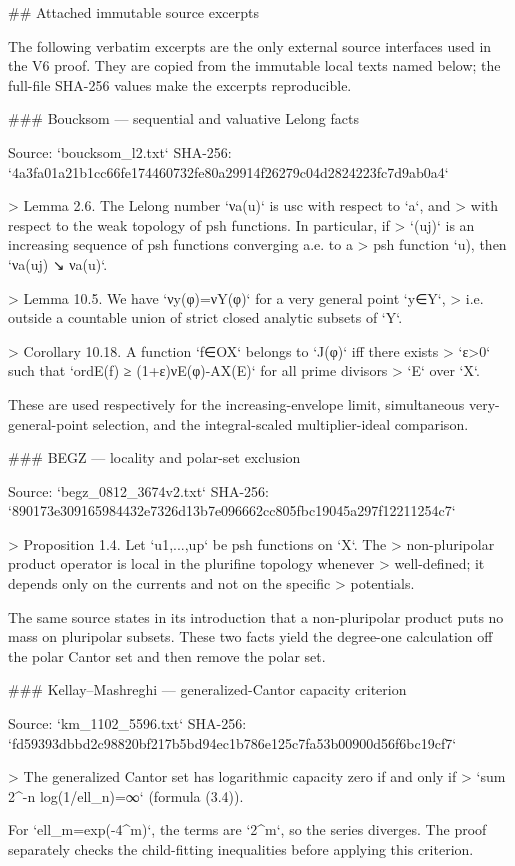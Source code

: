 ## Attached immutable source excerpts

The following verbatim excerpts are the only external source interfaces used
in the V6 proof.  They are copied from the immutable local texts named below;
the full-file SHA-256 values make the excerpts reproducible.

### Boucksom — sequential and valuative Lelong facts

Source: `boucksom_l2.txt`
SHA-256: `4a3fa01a21b1cc66fe174460732fe80a29914f26279c04d2824223fc7d9ab0a4`

> Lemma 2.6. The Lelong number `νa(u)` is usc with respect to `a`, and
> with respect to the weak topology of psh functions. In particular, if
> `(uj)` is an increasing sequence of psh functions converging a.e. to a
> psh function `u), then `νa(uj) ↘ νa(u)`.

> Lemma 10.5. We have `νy(φ)=νY(φ)` for a very general point `y∈Y`,
> i.e. outside a countable union of strict closed analytic subsets of `Y`.

> Corollary 10.18. A function `f∈OX` belongs to `J(φ)` iff there exists
> `ε>0` such that `ordE(f) ≥ (1+ε)νE(φ)-AX(E)` for all prime divisors
> `E` over `X`.

These are used respectively for the increasing-envelope limit, simultaneous
very-general-point selection, and the integral-scaled multiplier-ideal
comparison.

### BEGZ — locality and polar-set exclusion

Source: `begz_0812_3674v2.txt`
SHA-256: `890173e309165984432e7326d13b7e096662cc805fbc19045a297f12211254c7`

> Proposition 1.4. Let `u1,...,up` be psh functions on `X`. The
> non-pluripolar product operator is local in the plurifine topology whenever
> well-defined; it depends only on the currents and not on the specific
> potentials.

The same source states in its introduction that a non-pluripolar product
puts no mass on pluripolar subsets.  These two facts yield the degree-one
calculation off the polar Cantor set and then remove the polar set.

### Kellay--Mashreghi — generalized-Cantor capacity criterion

Source: `km_1102_5596.txt`
SHA-256: `fd59393dbbd2c98820bf217b5bd94ec1b786e125c7fa53b00900d56f6bc19cf7`

> The generalized Cantor set has logarithmic capacity zero if and only if
> `sum 2^{-n} log(1/ell_n)=∞` (formula (3.4)).

For `ell_m=exp(-4^m)`, the terms are `2^m`, so the series diverges.  The
proof separately checks the child-fitting inequalities before applying this
criterion.

